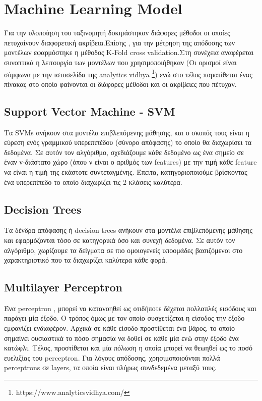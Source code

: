 \section{Machine Learning Model}

Για την υλοποίηση του ταξινομητή δοκιμάστηκαν διάφορες μέθοδοι οι οποίες πετυχαίνουν διαφορετική ακρίβεια.Επίσης , για την μέτρηση της απόδοσης των μοντέλων εφαρμόστηκε η μέθοδος K-Fold cross validation.Στη συνέχεια αναφέρεται συνοπτικά η λειτουργία των μοντέλων που χρησιμοποιήθηκαν (Οι ορισμοί είναι σύμφωνα με την ιστοσελίδα της analytics vidhya \footnote{https://www.analyticsvidhya.com/}) ενώ στο τέλος παρατίθεται ένας πίνακας στο οποίο φαίνονται οι διάφορες μέθοδοι και οι ακρίβειες που πέτυχαν.

\subsection{Support Vector Machine - SVM}

Τα SVMs ανήκουν στα μοντέλα επιβλεπόμενης μάθησης, και ο σκοπός τους είναι η εύρεση ενός γραμμικού υπερεπιπέδου (σύνορο απόφασης) το οποίο θα διαχωρίσει τα δεδομένα. Σε αυτόν τον αλγόριθμο, σχεδιάζουμε κάθε δεδομένο ως ένα σημείο σε έναν ν-διάστατο χώρο (όπου ν είναι ο αριθμός των features) με την τιμή κάθε feature να είναι η τιμή της εκάστοτε συντεταγμένης. Έπειτα, κατηγοριοποιούμε βρίσκοντας ένα υπερεπίπεδο το οποίο διαχωρίζει τις 2 κλάσεις καλύτερα.

\subsection{Decision Trees}

Τα δένδρα απόφασης ή decision trees ανήκουν στα μοντέλα επιβλεπόμενης μάθησης και εφαρμόζονται τόσο σε κατηγορικά όσο και συνεχή δεδομένα. Σε αυτόν τον αλγόριθμο, χωρίζουμε τα δείγματα σε πιο ομοιογενείς υποομάδες βασιζόμενοι στο χαρακτηριστικό που τα διαχωρίζει καλύτερα κάθε φορά.

\subsection{Multilayer Perceptron}

Ένα perceptron , μπορεί να κατανοηθεί ως οτιδήποτε δέχεται πολλαπλές εισόδους και παράγει μία έξοδο. Ο τρόπος όμως με τον οποίο συσχετίζεται η είσοδος την έξοδο εμφανίζει ενδιαφέρον. Αρχικά σε κάθε είσοδο προστίθεται ένα βάρος, το οποίο σημαίνει ουσιαστικά το πόσο σημασία να δοθεί σε κάθε μία ενώ στην έξοδο ένα κατώφλι. Τέλος, προστίθεται και μία πόλωση η οποία μπορεί να θεωηθεί ως το ποσό ευελιξίας του perceptron. Για λόγους απόδοσης, χρησιμοποιούνται πολλά perceptrons σε layers, τα οποία είναι πλήρως συνδεδεμένα μεταξύ τους.   

